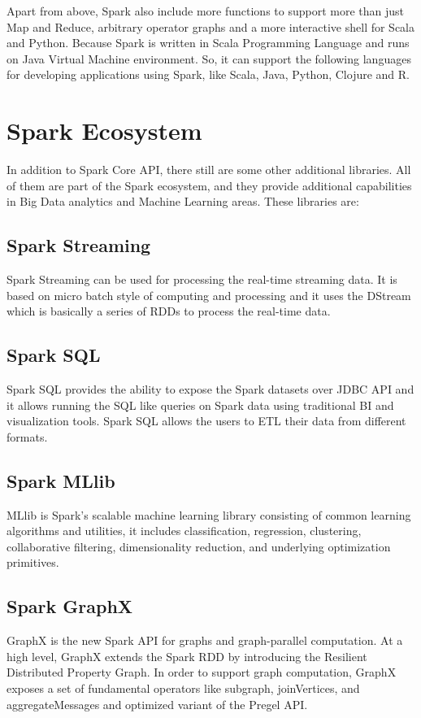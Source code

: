 \documentclass[sigconf]{acmart}
\begin{document}
Apart from above, Spark also include more functions to support more than just Map and Reduce, arbitrary operator graphs and a more interactive shell for Scala and Python.
Because Spark is written in Scala Programming Language and runs on Java Virtual Machine  environment. So, it can support the following languages for developing applications using Spark, like Scala, Java, Python, Clojure and R.


\section{Spark Ecosystem}
In addition to Spark Core API, there still are some other additional libraries. All of them are part of the Spark ecosystem, and they provide additional capabilities in Big Data analytics and Machine Learning areas.
These libraries are:


\subsection{Spark Streaming}
Spark Streaming can be used for processing the real-time streaming data. It is based on micro batch style of computing and processing and it uses the DStream which is basically a series of RDDs to process the real-time data.

\subsection{Spark SQL}
Spark SQL \cite{Armbrust:2015:SSR:2723372.2742797,} provides the ability to expose the Spark datasets over JDBC API and it allows running the SQL like queries on Spark data using traditional BI and visualization tools. Spark SQL allows the users to ETL their data from different formats.

\subsection{Spark MLlib}
MLlib is Spark’s scalable machine learning library consisting of common learning algorithms and utilities, it includes classification, regression, clustering, collaborative filtering, dimensionality reduction, and underlying optimization primitives.

\subsection{Spark GraphX}
GraphX is the new Spark API for graphs and graph-parallel computation. At a high level, GraphX extends the Spark RDD by introducing the Resilient Distributed Property Graph. In order to support graph computation, GraphX exposes a set of fundamental operators like subgraph, joinVertices, and aggregateMessages and optimized variant of the Pregel API.
\end{document}
